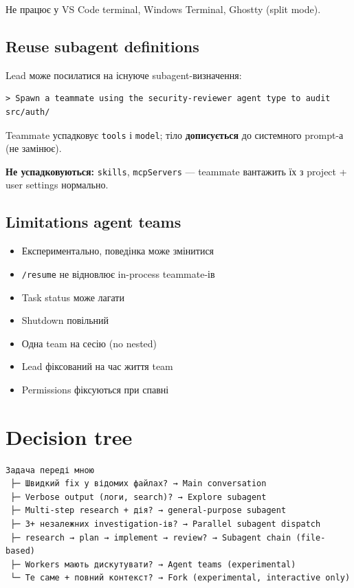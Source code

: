 \documentclass[11pt,a4paper]{article}
\begin{document}
Не працює у VS Code terminal, Windows Terminal, Ghostty (split mode).

\subsection{Reuse subagent definitions}

Lead може посилатися на існуюче subagent-визначення:
\begin{lstlisting}
> Spawn a teammate using the security-reviewer agent type to audit src/auth/
\end{lstlisting}

Teammate успадковує \texttt{tools} і \texttt{model}; тіло \textbf{дописується} до системного prompt-а (не замінює).

\textbf{Не успадковуються:} \texttt{skills}, \texttt{mcpServers} --- teammate вантажить їх з project + user settings нормально.

\subsection{Limitations agent teams}

\begin{itemize}
  \item Експериментально, поведінка може змінитися
  \item \texttt{/resume} не відновлює in-process teammate-ів
  \item Task status може лагати
  \item Shutdown повільний
  \item Одна team на сесію (no nested)
  \item Lead фіксований на час життя team
  \item Permissions фіксуються при спавні
\end{itemize}

\section{Decision tree}

\begin{lstlisting}
Задача переді мною
 ├─ Швидкий fix у відомих файлах? → Main conversation
 ├─ Verbose output (логи, search)? → Explore subagent
 ├─ Multi-step research + дія? → general-purpose subagent
 ├─ 3+ незалежних investigation-ів? → Parallel subagent dispatch
 ├─ research → plan → implement → review? → Subagent chain (file-based)
 ├─ Workers мають дискутувати? → Agent teams (experimental)
 └─ Те саме + повний контекст? → Fork (experimental, interactive only)
\end{lstlisting}
\end{document}
